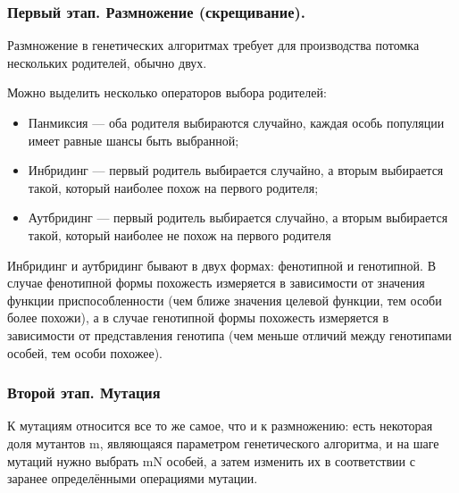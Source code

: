 \subsubsection{Первый этап. Размножение (скрещивание).}
\noindent\indent
Размножение в генетических алгоритмах требует для производства потомка нескольких
родителей, обычно двух.\par
Можно выделить несколько операторов выбора родителей:
\begin{itemize}
  \item Панмиксия — оба родителя выбираются случайно, каждая особь популяции имеет
  равные шансы быть выбранной;
  \item Инбридинг — первый родитель выбирается случайно, а вторым выбирается такой,
  который наиболее похож на первого родителя;
  \item Аутбридинг — первый родитель выбирается случайно, а вторым выбирается такой,
  который наиболее не похож на первого родителя
\end{itemize}
Инбридинг и аутбридинг бывают в двух формах: фенотипной и генотипной. В случае
фенотипной формы похожесть измеряется в зависимости от значения функции приспособленности
(чем ближе значения целевой функции, тем особи более похожи), а в случае генотипной
формы похожесть измеряется в зависимости от представления генотипа (чем меньше
отличий между генотипами особей, тем особи похожее).
\subsubsection{Второй этап. Мутация}
\noindent\indent К мутациям относится все то же самое, что и к размножению: есть
некоторая доля мутантов m, являющаяся параметром генетического алгоритма, и на шаге
мутаций нужно выбрать mN особей, а затем изменить их в соответствии с заранее
определёнными операциями мутации.
